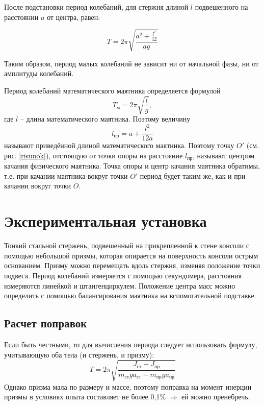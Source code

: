	
	\noindent После подстановки период колебаний, для стержня длиной $l$ подвешенного на расстоянии $a$ от центра, равен:
	
	\begin{equation}\label{time_a}
		T=2\pi\sqrt{\frac{a^2+\frac{l^2}{12}}{ag}}
	\end{equation}
	
	Таким образом, период малых колебаний не зависит ни от начальной фазы, ни от амплитуды колебаний.
	\medspace
	
	Период колебаний математического маятника определяется формулой
	\begin{equation}
		T_\text{м}=2\pi\sqrt{\frac{l}{g}},
	\end{equation}
	где $ l $ -- длина математического маятника. Поэтому величину
	\begin{equation}\label{prived}
		l_\text{пр}=a+\frac{l^2}{12a}
	\end{equation}
	называют приведённой длиной математического маятника. Поэтому точку $ O' $ (см. рис. \ref{risunok}), отстоящую от точки опоры на расстояние $ l_\text{пр} $, называют центром качания физического маятника. Точка опоры и центр качания маятника обратимы, т.е. при качании маятника вокруг  точки $ O' $ период будет таким же, как и при качании вокруг точки $ O $.
	
	\section {Экспериментальная установка}
	Тонкий стальной стержень, подвешенный на прикрепленной к стене консоли с помощью небольшой призмы, которая опирается на поверхность консоли острым основанием. Призму можно перемещать вдоль стержня, изменяя положение точки подвеса. Период колебаний измеряется с помощью секундомера, расстояния измеряются линейкой и штангенциркулем. Положение центра масс можно определить с помощью балансирования маятника на вспомогательной подставке.
	
	
	
	\subsection{Расчет поправок}
	Если быть честными, то для вычисления периода следует использовать формулу, учитывающую оба тела (и стержень, и призму):
	\begin{equation}
		T = 2\pi\sqrt{\frac{J_\text{ст} + J_\text{пр}}{m_\text{ст}ga_\text{ст}-m_\text{пр}ga_\text{пр}}}
	\end{equation}
	Однако призма мала по размеру и массе, поэтому поправка на момент инерции призмы в условиях опыта составляет не более 0,1\% $\Rightarrow$ ей можно пренебречь.
	

